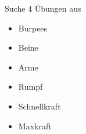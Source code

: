 Suche 4 Übungen aus
\begin{itemize}
    \item Burpees
    \item Beine
    \item Arme
    \item Rumpf
    \item Schnellkraft
    \item Maxkraft
\end{itemize}